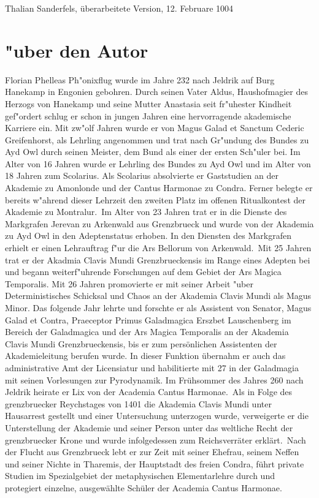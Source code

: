 \documentclass[a5paper,8pt]{book}
\begin{document}
Thalian Sanderfels, überarbeitete Version, 12. Februare 1004

\appendix



\chapter{"uber den Autor}


Florian Phelleas Ph"onixflug wurde im Jahre 232 nach Jeldrik auf Burg Hanekamp in Engonien gebohren. Durch seinen Vater Aldus, Haushofmagier des Herzogs von Hanekamp 
und seine Mutter Anastasia seit fr"uhester Kindheit gef"ordert schlug er schon in jungen Jahren eine hervorragende akademische Karriere ein.
Mit zw"olf Jahren wurde er von Magus Galad et Sanctum Cederic Greifenhorst, als Lehrling angenommen und trat nach Gr"undung des Bundes zu Ayd Owl durch seinen Meister, 
dem Bund als einer der ersten Sch"uler bei. Im Alter von 16 Jahren wurde er Lehrling des Bundes zu Ayd Owl und im Alter von 18 Jahren zum Scolarius.
Als Scolarius absolvierte er Gaststudien an der Akademie zu Amonlonde und der Cantus Harmonae zu Condra. Ferner belegte er bereits w"ahrend dieser Lehrzeit den zweiten 
Platz im offenen Ritualkontest der Akademie zu Montralur.\
Im Alter von 23 Jahren trat er in die Dienste des Markgrafen Jerevan zu Arkenwald aus Grenzbrueck und wurde von der Akademia zu Ayd Owl in den Adeptenstatus erhoben. 
In den Diensten des Markgrafen erhielt er einen Lehrauftrag f"ur die Ars Bellorum von Arkenwald.\
Mit 25 Jahren trat er der Akadmia Clavis Mundi Grenzbrueckensis im Range eines Adepten bei und begann weiterf"uhrende Forschungen auf dem Gebiet der Ars Magica Temporalis.
Mit 26 Jahren promovierte er mit seiner Arbeit "uber Deterministisches Schicksal und Chaos an der Akademia Clavis Mundi als Magus Minor.
Das folgende Jahr lehrte und forschte er als Assistent von Senator, Magus Galad et Contra, Praeceptor Primus Galadmagica Erszbet Lauschenberg im Bereich der Galadmagica 
und der Ars Magica Temporalis an der Akademia Clavis Mundi Grenzbrueckensis, bis er zum persönlichen Assistenten der Akademieleitung berufen wurde. In dieser Funktion
übernahm er auch das administrative Amt der Licensiatur und habilitierte mit 27 in der Galadmagia mit seinen Vorlesungen zur Pyrodynamik. 
Im Frühsommer des Jahres 260 nach Jeldrik heirate er Lix von der Academia Cantus Harmonae.\
Als in Folge des
grenzbruecker Reychstages von 1401 die Akademia Clavis Mundi unter Hausarrest gestellt und einer Untersuchung unterzogen wurde, verweigerte er die Unterstellung der Akademie
und seiner Person unter das weltliche Recht der grenzbruecker Krone und wurde infolgedessen zum Reichsverräter erklärt.\
Nach der Flucht aus Grenzbrueck lebt er zur Zeit mit seiner Ehefrau, seinem Neffen und seiner Nichte in Tharemis, der Hauptstadt des freien Condra, führt private Studien
im Spezialgebiet der metaphysischen Elementarlehre durch und protegiert einzelne, ausgewählte Schüler der Academia Cantus Harmonae.
\end{document}
